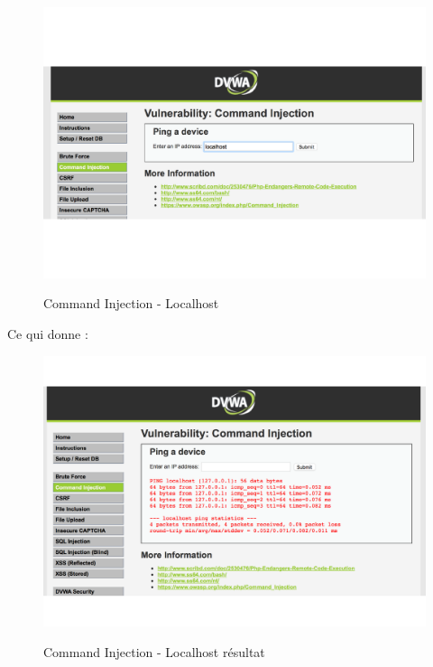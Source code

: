 \begin{figure}[!h]
\begin{center}

\label{inclusion}
\includegraphics[scale=1.2]{images/CommandInjection-Localhost.pdf}

\caption{Command Injection - Localhost}

\end{center}
\end{figure}

Ce qui donne :

\begin{figure}[!h]
\begin{center}

\label{inclusion}
\includegraphics[scale=1.2]{images/CommandInjection-LocalhostResultat.pdf}

\caption{Command Injection - Localhost résultat}

\end{center}
\end{figure}

